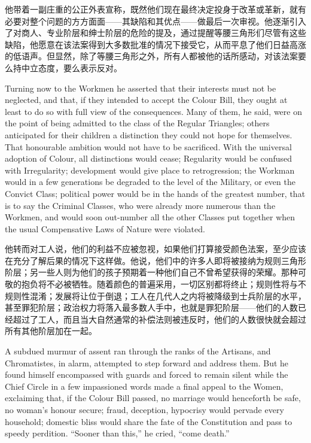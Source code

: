 \documentclass[12pt,UTF8]{ctexbook}
\begin{document}
他带着一副庄重的公正外表宣称，既然他们现在最终决定投身于改革或革新，就有必要对整个问题的方方面面——其缺陷和其优点——做最后一次审视。他逐渐引入了对商人、专业阶层和绅士阶层的危险的提及，通过提醒等腰三角形们尽管有这些缺陷，他愿意在该法案得到大多数批准的情况下接受它，从而平息了他们日益高涨的低语声。但显然，除了等腰三角形之外，所有人都被他的话所感动，对该法案要么持中立态度，要么表示反对。

Turning now to the Workmen he asserted that their interests must not be neglected, and that, if they intended to accept the Colour Bill, they ought at least to do so with full view of the consequences. Many of them, he said, were on the point of being admitted to the class of the Regular Triangles; others anticipated for their children a distinction they could not hope for themselves. That honourable ambition would not have to be sacrificed. With the universal adoption of Colour, all distinctions would cease; Regularity would be confused with Irregularity; development would give place to retrogression; the Workman would in a few generations be degraded to the level of the Military, or even the Convict Class; political power would be in the hands of the greatest number, that is to say the Criminal Classes, who were already more numerous than the Workmen, and would soon out-number all the other Classes put together when the usual Compensative Laws of Nature were violated.

他转而对工人说，他们的利益不应被忽视，如果他们打算接受颜色法案，至少应该在充分了解后果的情况下这样做。他说，他们中的许多人即将被接纳为规则三角形阶层；另一些人则为他们的孩子预期着一种他们自己不曾希望获得的荣耀。那种可敬的抱负将不必被牺牲。随着颜色的普遍采用，一切区别都将终止；规则性将与不规则性混淆；发展将让位于倒退；工人在几代人之内将被降级到士兵阶层的水平，甚至罪犯阶层；政治权力将落入最多数人手中，也就是罪犯阶层——他们的人数已经超过了工人，而且当大自然通常的补偿法则被违反时，他们的人数很快就会超过所有其他阶层加在一起。

A subdued murmur of assent ran through the ranks of the Artisans, and Chromatistes, in alarm, attempted to step forward and address them. But he found himself encompassed with guards and forced to remain silent while the Chief Circle in a few impassioned words made a final appeal to the Women, exclaiming that, if the Colour Bill passed, no marriage would henceforth be safe, no woman's honour secure; fraud, deception, hypocrisy would pervade every household; domestic bliss would share the fate of the Constitution and pass to speedy perdition. ``Sooner than this,'' he cried, ``come death.''
\end{document}
